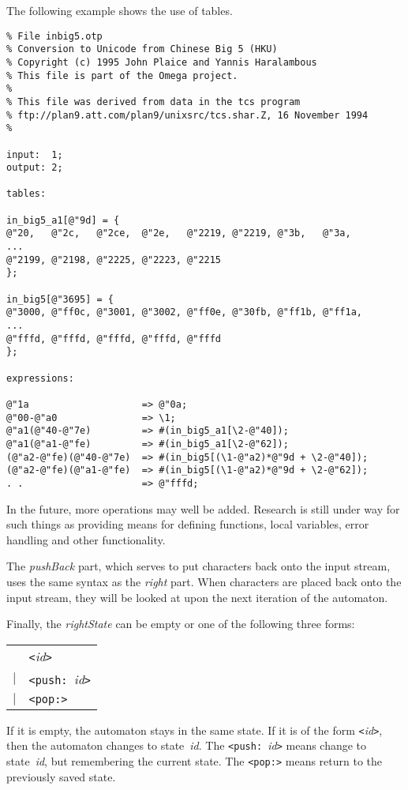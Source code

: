 \documentclass[fleqn]{article}
\begin{document}
The following example shows the use of tables.
\label{gb:unicode}
\begin{verbatim}
% File inbig5.otp
% Conversion to Unicode from Chinese Big 5 (HKU)
% Copyright (c) 1995 John Plaice and Yannis Haralambous
% This file is part of the Omega project.
%
% This file was derived from data in the tcs program
% ftp://plan9.att.com/plan9/unixsrc/tcs.shar.Z, 16 November 1994
%

input:  1;
output: 2;

tables:

in_big5_a1[@"9d] = {
@"20,   @"2c,   @"2ce,  @"2e,   @"2219, @"2219, @"3b,   @"3a,
...
@"2199, @"2198, @"2225, @"2223, @"2215
};

in_big5[@"3695] = {
@"3000, @"ff0c, @"3001, @"3002, @"ff0e, @"30fb, @"ff1b, @"ff1a,
...
@"fffd, @"fffd, @"fffd, @"fffd, @"fffd
};

expressions:

@"1a                    => @"0a;
@"00-@"a0               => \1;
@"a1(@"40-@"7e)         => #(in_big5_a1[\2-@"40]);
@"a1(@"a1-@"fe)         => #(in_big5_a1[\2-@"62]);
(@"a2-@"fe)(@"40-@"7e)  => #(in_big5[(\1-@"a2)*@"9d + \2-@"40]);
(@"a2-@"fe)(@"a1-@"fe)  => #(in_big5[(\1-@"a2)*@"9d + \2-@"62]);
. .                     => @"fffd;
\end{verbatim}

In the future, more operations may well be added.  Research is still
under way for such things as providing means for defining functions, 
local variables, error handling and other functionality.

The \emph{pushBack} part, which serves to put characters back onto the
input stream, uses the same syntax as the \emph{right} part.  When
characters are placed back onto the input stream, they will be looked
at upon the next iteration of the automaton.

Finally, the \emph{rightState} can be empty or one of the following
three forms:

\begin{tabular}{ll}
& \verb|<|\emph{id}\verb|>|\\
$\mid$ & \verb|<push: |\emph{id}\verb|>|\\
$\mid$ & \verb|<pop:>|\\
\end{tabular}

\noindent
If it is empty, the automaton stays in the same state.
If it is of the form \verb|<|\emph{id}\verb|>|, then the automaton
changes to state~\emph{id}. The \verb|<push: |\emph{id}\verb|>|
means change to state~\emph{id}, but remembering the current state.
The \verb|<pop:>| means return to the previously saved state.
\end{document}
